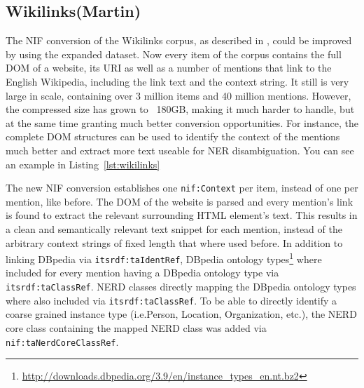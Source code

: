 \documentclass[10pt, a4paper]{article}
\begin{document}
\subsection{Wikilinks(Martin)}
The NIF conversion of the Wikilinks corpus, as described in \cite{Hellmann-2013-iswc}, could be improved by using the expanded dataset. 
Now every item of the corpus contains the full DOM of a website, its URI as well as a number of mentions that link to the English Wikipedia, including the link text and the context string.
It still is very large in scale, containing over 3 million items and 40 million mentions.
However, the compressed size has grown to ~180GB, making it much harder to handle, but at the same time granting much better conversion opportunities.
For instance, the complete DOM structures can be used to identify the context of the mentions much better and extract more text useable for NER disambiguation.
You can see an example in Listing~\ref{lst:wikilinks}

The new NIF conversion establishes one \texttt{nif:Context} per item, instead of one per mention, like before.
The DOM of the website is parsed and every mention's link is found to extract the relevant surrounding HTML element's text.
This results in a clean and semantically relevant text snippet for each mention, instead of the arbitrary context strings of fixed length that where used before.
In addition to linking DBpedia via \texttt{itsrdf:taIdentRef}, DBpedia ontology types\footnote{\url{http://downloads.dbpedia.org/3.9/en/instance_types_en.nt.bz2}} where included for every mention having a DBpedia ontology type via \texttt{itsrdf:taClassRef}.
NERD classes directly mapping the DBpedia ontology types where also included via \texttt{itsrdf:taClassRef}.
To be able to directly identify a coarse grained instance type (i.e.Person, Location, Organization, etc.), the NERD core class containing the mapped NERD class was added via \texttt{nif:taNerdCoreClassRef}.
\end{document}
